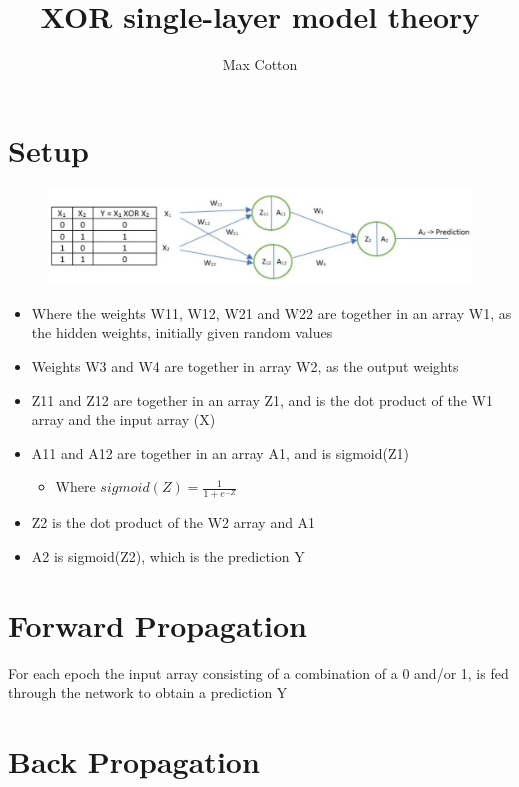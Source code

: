 \documentclass[10pt,a4paper]{article}
\title{XOR single-layer model theory}
\author{Max Cotton}
\date{}
\begin{document}
\maketitle

\section{Setup}

\begin{figure}[h!]
\centering
\includegraphics[width=1\textwidth]{src/images/xor-ann-diagram.png}
\end{figure}

\begin{itemize}
    \item Where the weights W11, W12, W21 and W22 are together in an array W1, as the hidden weights, initially given random values
    \item Weights W3 and W4 are together in array W2, as the output weights
    \item Z11 and Z12 are together in an array Z1, and is the dot product of the W1 array and the input array (X)
    \item A11 and A12 are together in an array A1, and is sigmoid(Z1)
    \begin{itemize}
        \item Where $sigmoid(Z) = \frac{1}{1+e^{-Z}}$
    \end{itemize}
    \item Z2 is the dot product of the W2 array and A1
    \item A2 is sigmoid(Z2), which is the prediction Y
\end{itemize}

\section{Forward Propagation}
For each epoch the input array consisting of a combination of a 0 and/or 1, is fed through the network to obtain a prediction Y

\section{Back Propagation}
\end{document}
